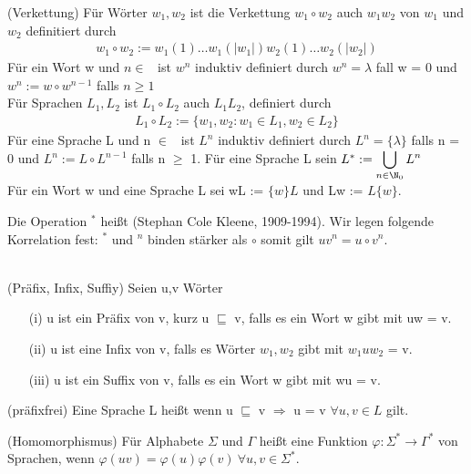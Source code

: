 \documentclass[a4paper]{article}
\begin{document}
\begin{DefBox}{(Verkettung)}
Für Wörter $w_1,w_2$ ist die Verkettung $w_1 \circ w_2$ auch $w_1 w_2$ von $w_1$ und $w_2$ definitiert durch
\begin{align*}
w_1 \circ w_2 := w_1(1) \dots w_1(|w_1|) w_2(1) \dots w_2(|w_2|)
\end{align*}
Für ein Wort w und $n \in$ \NN \ ist $w^n$ induktiv definiert durch $w^n = \lambda$ fall w = 0 und $w^n := w \circ w^{n-1}$ falls $n \geq 1$ \\
Für Sprachen $L_1,L_2$ ist $L_1 \circ L_2$ auch $L_1 L_2$, definiert durch
\begin{align*}
 L_1 \circ L_2 := \lbrace w_1,w_2 : w_1 \in L_1, w_2 \in L_2 \rbrace
\end{align*}
Für eine Sprache L und n $\in$ \NN \ ist $L^n$ induktiv definiert durch $L^n = \lbrace \lambda \rbrace$ falls n = 0 und $L^n := L \circ L^{n-1}$ falls n $\geq$ 1. Für eine Sprache L sein $L^* := \displaystyle\bigcup_{n\in \N_0} L^n$ \\
Für ein Wort w und eine Sprache L sei wL := $\lbrace w \rbrace L$ und Lw := $L\lbrace w \rbrace$.
\end{DefBox}
Die Operation $^*$ heißt  (Stephan Cole Kleene, 1909-1994). Wir legen folgende Korrelation fest: $^*$ und $^n$ binden stärker als $\circ$ somit gilt $uv^n = u \circ v^n$. \\
\\
\begin{DefBox}{(Präfix, Infix, Suffiy)}
Seien u,v Wörter
\begin{itemize}
 \item[(i)] u ist ein Präfix von v, kurz u $\sqsubseteq$ v, falls es ein Wort w gibt mit uw = v.
 \item[(ii)] u ist eine Infix von v, falls es Wörter $w_1,w_2$ gibt mit $w_1 u w_2$ = v.
 \item[(iii)] u ist ein Suffix von v, falls es ein Wort w gibt mit wu = v.
\end{itemize}
\end{DefBox}

\begin{DefBox}{(präfixfrei)}
Eine Sprache L heißt  wenn u $\sqsubseteq$ v $\Rightarrow$ u = v $\forall u,v \in L$ gilt.
\end{DefBox}

\begin{DefBox}{(Homomorphismus)}
 Für Alphabete $\Sigma$ und $\Gamma$ heißt eine Funktion $\varphi : \Sigma^* \rightarrow \Gamma^*$  von Sprachen, wenn $\varphi(uv) = \varphi(u) \varphi(v) \ \forall u,v \in \Sigma^*$.
\end{DefBox}
\end{document}
